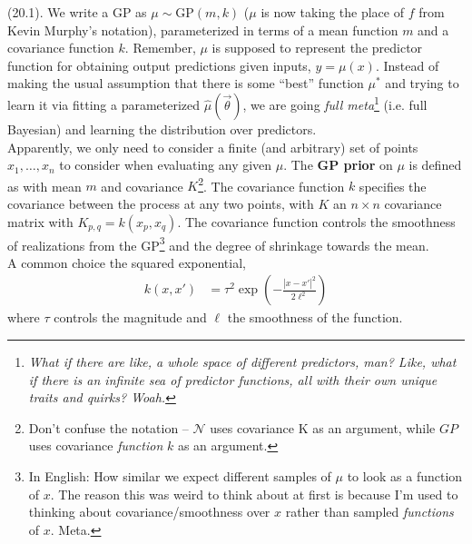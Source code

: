 \documentclass[11pt]{article}
\begin{document}
\myspace
\p {} (20.1). We write a GP as $\mu \sim \text{GP}(m, k)$ ($\mu$ is now taking the place of $f$ from Kevin Murphy's notation), parameterized in terms of a mean function $m$ and a covariance function $k$. Remember, $\mu$ is supposed to represent the predictor function for obtaining output predictions given inputs, $y = \mu(x)$. Instead of making the usual assumption that there is some ``best'' function $\mu^*$ and trying to learn it via fitting a parameterized $\hat{\mu}(\vec \theta)$, we are going \textit{full meta}\footnote{\textit{What if there are like, a whole space of different predictors, man? Like, what if there is an infinite sea of predictor functions, all with their own unique traits and quirks? Woah.}} (i.e. full Bayesian) and learning the distribution over predictors. \\

Apparently, we only need to consider a finite (and arbitrary) set of points $x_1, \ldots, x_n$ to consider when evaluating any given $\mu$. The \textbf{GP prior} on $\mu$ is defined as 
with mean $m$ and covariance $K$\footnote{Don't confuse the notation -- $\mathcal{N}$ uses covariance K as an argument, while $GP$ uses covariance \textit{function} $k$ as an argument.}. The covariance function $k$ specifies the covariance between the process at any two points, with $K$ an $n \times n$ covariance matrix with $K_{p, q} = k(x_p, x_q)$. The covariance function controls the smoothness of realizations from the GP\footnote{In English: How similar we expect different samples of $\mu$ to look as a function of $x$. The reason this was weird to think about at first is because I'm used to thinking about covariance/smoothness over $x$ rather than sampled \textit{functions} of $x$. Meta.} and the degree of shrinkage towards the mean. \\

A common choice the squared exponential,
\begin{align}
	k(x, x')
		&= \tau^2 \exp\left( - \frac{  |x - x'|^2 }{ 2 \ell^2 } \right)
\end{align} 
where $\tau$ controls the magnitude and $\ell$ the smoothness of the function. 



\renewcommand\tlab[1]{\tag{#1}\label{#1}}
\newcommand{\y}{\vec y}
\label{ESL}
\end{document}

